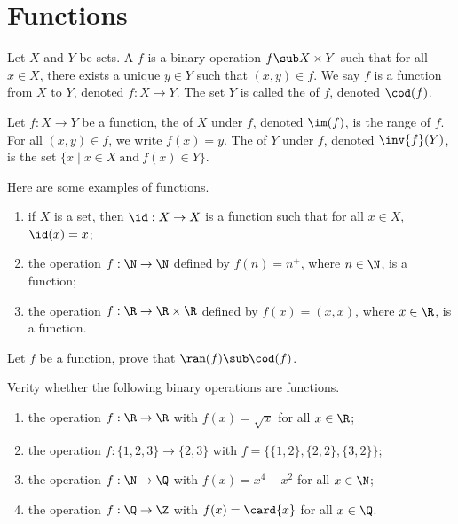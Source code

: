 \documentclass[10pt]{article}
\begin{document}
\section{Functions}
\begin{definition}
    Let $X$ and $Y$ be sets. A  $f$ is a binary operation $f\sub X\times Y$ such that for all $x\in X$, there exists a unique $y\in Y$ such that $(x,y)\in f$. We say $f$ is a function from $X$ to $Y$, denoted $f:X\to Y$. The set $Y$ is called the  of $f$, denoted $\cod(f)$.
\end{definition}
\begin{definition}
    Let $f:X\to Y$ be a function, the  of $X$ under $f$, denoted $\im(f)$, is the range of $f$. For all $(x,y)\in f$, we write $f(x)=y$. The  of $Y$ under $f$, denoted $\inv{f}(Y)$, is the set $\{x\mid x\in X\ \text{and}\ f(x)\in Y\}$.
\end{definition}
\begin{example}
    Here are some examples of functions.
    \begin{enumerate}
        \item if $X$ is a set, then $\id:X\to X$ is a function such that for all $x\in X$, $\id(x)=x$;
        \item the operation $f:\N\to\N$ defined by $f(n)={n}^{+}$, where $n\in\N$, is a function;
        \item the operation $f:\R\to\R\times\R$ defined by $f(x)=(x,x)$, where $x\in\R$, is a function.
    \end{enumerate}
\end{example}
\begin{problem}
    Let $f$ be a function, prove that $\ran(f)\sub\cod(f)$.
\end{problem}
\begin{problem}
    Verity whether the following binary operations are functions.
    \begin{enumerate}
        \item the operation $f:\R\to\R$ with $f(x)=\sqrt{x}$ for all $x\in\R$;
        \item the operation $f:\{1,2,3\}\to\{2,3\}$ with $f=\{\{1,2\},\{2,2\},\{3,2\}\}$;
        \item the operation $f:\N\to\Q$ with $f(x)={x}^{4}-{x}^{2}$ for all $x\in\N$;
        \item the operation $f:\Q\to\Z$ with $f(x)=\card{x}$ for all $x\in\Q$.
    \end{enumerate}
\end{problem}
\end{document}
